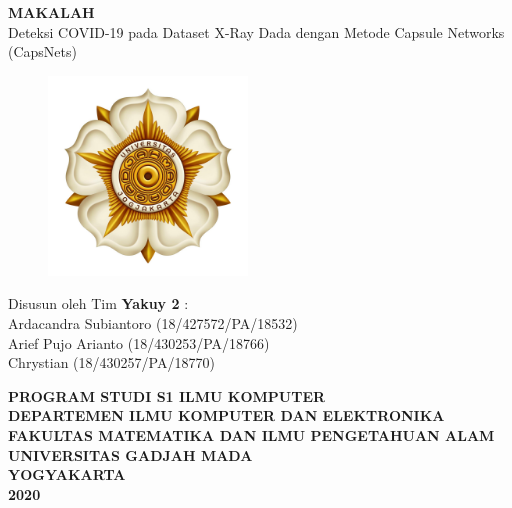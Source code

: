 \documentclass{article}
\begin{document}
  \begin{titlepage}
    \begin{center}
      
      \null
      {
      \huge \bfseries MAKALAH}\\
      [1cm]
      {\LARGE Deteksi COVID-19 pada Dataset X-Ray Dada dengan Metode Capsule Networks (CapsNets)}\\
          
      \vspace{2cm}

      \begin{figure}[H]
        \centering
        \includegraphics[width=200px]{Lambang UGM.jpg}
      \end{figure}
          
      \vspace{3cm}
    
      {\Large 
      Disusun oleh Tim \bfseries Yakuy 2} {\Large :\\
      \vspace{0.5cm}
      Ardacandra Subiantoro (18/427572/PA/18532)\\
      Arief Pujo Arianto (18/430253/PA/18766)\\
      Chrystian (18/430257/PA/18770)\\
      }


      \vspace{2cm}

      {\normalsize \bfseries
      PROGRAM STUDI S1 ILMU KOMPUTER\\
      DEPARTEMEN ILMU KOMPUTER DAN ELEKTRONIKA\\
      FAKULTAS MATEMATIKA DAN ILMU PENGETAHUAN ALAM\\
      UNIVERSITAS GADJAH MADA\\
      YOGYAKARTA\\
      \vspace{0.2cm}
      2020
      }
            
    \end{center}
  \end{titlepage}
\end{document}
